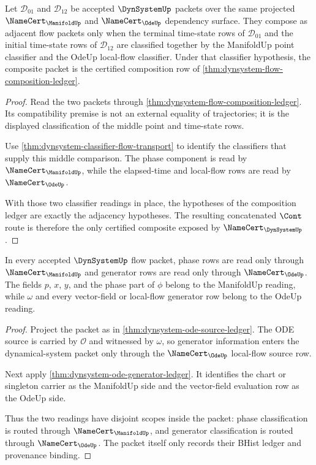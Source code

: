 \begin{theorem}
\label{thm:dynsystem-flow-adjacency-classifier}
Let $\mathcal{D}_{01}$ and $\mathcal{D}_{12}$ be accepted $\DynSystemUp$ packets over the same projected $\NameCert_{\ManifoldUp}$ and $\NameCert_{\OdeUp}$ dependency surface. They compose as adjacent flow packets only when the terminal time-state rows of $\mathcal{D}_{01}$ and the initial time-state rows of $\mathcal{D}_{12}$ are classified together by the ManifoldUp point classifier and the OdeUp local-flow classifier. Under that classifier hypothesis, the composite packet is the certified composition row of \autoref{thm:dynsystem-flow-composition-ledger}.
\end{theorem}
\begin{proof}
Read the two packets through \autoref{thm:dynsystem-flow-composition-ledger}. Its compatibility premise is not an external equality of trajectories; it is the displayed classification of the middle point and time-state rows.

Use \autoref{thm:dynsystem-classifier-flow-transport} to identify the classifiers that supply this middle comparison. The phase component is read by $\NameCert_{\ManifoldUp}$, while the elapsed-time and local-flow rows are read by $\NameCert_{\OdeUp}$.

With those two classifier readings in place, the hypotheses of the composition ledger are exactly the adjacency hypotheses. The resulting concatenated $\Cont$ route is therefore the only certified composite exposed by $\NameCert_{\DynSystemUp}$.
\end{proof}

\begin{theorem}
\label{thm:dynsystem-ode-phase-scope-separation}
In every accepted $\DynSystemUp$ flow packet, phase rows are read only through $\NameCert_{\ManifoldUp}$ and generator rows are read only through $\NameCert_{\OdeUp}$. The fields $p$, $x$, $y$, and the phase part of $\phi$ belong to the ManifoldUp reading, while $\omega$ and every vector-field or local-flow generator row belong to the OdeUp reading.
\end{theorem}
\begin{proof}
Project the packet as in \autoref{thm:dynsystem-ode-source-ledger}. The ODE source is carried by $\mathcal{O}$ and witnessed by $\omega$, so generator information enters the dynamical-system packet only through the $\NameCert_{\OdeUp}$ local-flow source row.

Next apply \autoref{thm:dynsystem-ode-generator-ledger}. It identifies the chart or singleton carrier as the ManifoldUp side and the vector-field evaluation row as the OdeUp side.

Thus the two readings have disjoint scopes inside the packet: phase classification is routed through $\NameCert_{\ManifoldUp}$, and generator classification is routed through $\NameCert_{\OdeUp}$. The packet itself only records their BHist ledger and provenance binding.
\end{proof}

